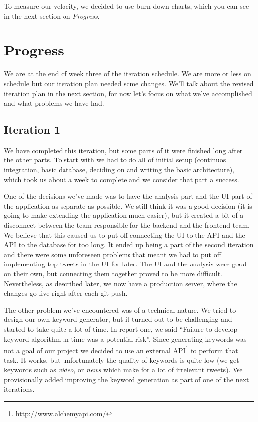 \documentclass[a4paper,12pt]{article}
\begin{document}
	To measure our velocity, we decided to use burn down charts, which you can see in the next section on \emph{Progress}.
	
	\section{Progress}
	We are at the end of week three of the iteration schedule. We are more or less on schedule but our iteration plan needed some changes. We'll talk about the revised iteration plan in the next section, for now let's focus on what we've accomplished and what problems we have had.
	
	\subsection{Iteration 1}
	We have completed this iteration, but some parts of it were finished long after the other parts. To start with we had to do all of initial setup (continuos integration, basic database, deciding on and writing the basic architecture), which took us about a week to complete and we consider that part a success.
	
	One of the decisions we've made was to have the analysis part and the UI part of the application as separate as possible. We still think it was a good decision (it is going to make extending the application much easier), but it created a bit of a disconnect between the team responsible for the backend and the frontend team. We believe that this caused us to put off connecting the UI to the API and the API to the database for too long. It ended up being a part of the second iteration and there were some unforeseen problems that meant we had to put off implementing top tweets in the UI for later. The UI and the analysis were good on their own, but connecting them together proved to be more difficult. Nevertheless, as described later, we now have a production server, where the changes go live right after each git push.
	
	The other problem we've encountered was of a technical nature. We tried to design our own keyword generator, but it turned out to be challenging and started to take quite a lot of time. In report one, we said ``Failure to develop keyword algorithm in time was a potential risk''. Since generating keywords was not a goal of our project we decided to use an external API\footnote{\url{http://www.alchemyapi.com/}} to perform that task. It works, but unfortunately the quality of keywords is quite low (we get keywords such as \emph{video}, or \emph{news} which make for a lot of irrelevant tweets). We provisionally added improving the keyword generation as part of one of the next iterations.
	
\end{document}
